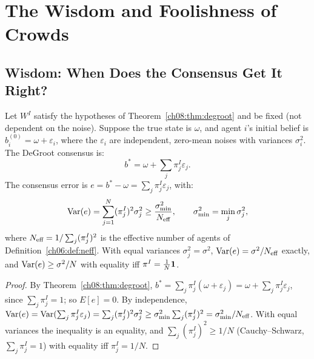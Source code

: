 \documentclass[../structural_economics_book.tex]{subfiles}
\begin{document}
\section{The Wisdom and Foolishness of Crowds}
\label{ch08:sec:wisdom}

\subsection{Wisdom: When Does the Consensus Get It Right?}

\begin{proposition}\label{ch08:thm:wisdom}
Let $W^I$ satisfy the hypotheses of Theorem~\ref{ch08:thm:degroot} and be fixed (not dependent on the noise). Suppose the true state is $\omega$, and agent $i$'s initial belief is $b_i^{(0)} = \omega + \varepsilon_i$, where the $\varepsilon_i$ are independent, zero-mean noises with variances $\sigma_i^2$. The DeGroot consensus is:
\begin{equation}
b^* = \omega + \sum_j \pi^I_j \varepsilon_j.
\end{equation}
The consensus error is $e = b^* - \omega = \sum_j \pi^I_j \varepsilon_j$, with:
\begin{equation}\label{ch08:eq:wisdom}
\operatorname{Var}(e) = \sum_{j=1}^N (\pi^I_j)^2 \sigma_j^2 \geq \frac{\sigma_{\min}^2}{N_{\text{eff}}}, \qquad \sigma_{\min}^2 = \min_j \sigma_j^2,
\end{equation}
where $N_{\text{eff}} = 1/\sum_j (\pi^I_j)^2$ is the effective number of agents of Definition~\ref{ch06:def:neff}. With equal variances $\sigma_j^2 = \sigma^2$, $\operatorname{Var}(e) = \sigma^2/N_{\text{eff}}$ exactly, and $\operatorname{Var}(e) \geq \sigma^2/N$ with equality iff $\pi^I = \frac1N\mathbf{1}$.
\end{proposition}

\begin{proof}
By Theorem~\ref{ch08:thm:degroot}, $b^* = \sum_j \pi^I_j(\omega + \varepsilon_j) = \omega + \sum_j \pi^I_j\varepsilon_j$, since $\sum_j \pi^I_j = 1$; so $E[e] = 0$. By independence, $\operatorname{Var}(e) = \operatorname{Var}(\sum_j \pi^I_j \varepsilon_j) = \sum_j (\pi^I_j)^2 \sigma_j^2 \geq \sigma_{\min}^2\sum_j (\pi^I_j)^2 = \sigma_{\min}^2/N_{\text{eff}}$. With equal variances the inequality is an equality, and $\sum_j (\pi^I_j)^2 \geq 1/N$ (Cauchy--Schwarz, $\sum_j \pi^I_j = 1$) with equality iff $\pi^I_j = 1/N$.
\end{proof}
\end{document}
